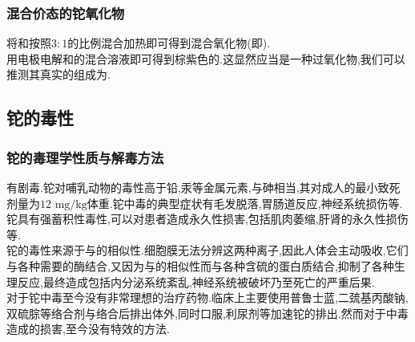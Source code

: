 \documentclass{ctexart}
\begin{document}
\subsubsection{混合价态的铊氧化物}
将和按照$3:1$的比例混合加热即可得到混合氧化物(即).\\
\indent 用电极电解和的混合溶液即可得到棕紫色的.这显然应当是一种过氧化物,我们可以推测其真实的组成为.
\subsection{铊的毒性}
\subsubsection{铊的毒理学性质与解毒方法}
有剧毒.铊对哺乳动物的毒性高于铅,汞等金属元素,与砷相当,其对成人的最小致死剂量为$12\text{ mg/kg}$体重.铊中毒的典型症状有毛发脱落,胃肠道反应,神经系统损伤等.铊具有强蓄积性毒性,可以对患者造成永久性损害,包括肌肉萎缩,肝肾的永久性损伤等.\\
\indent 铊的毒性来源于与的相似性.细胞膜无法分辨这两种离子,因此人体会主动吸收,它们与各种需要的酶结合,又因为与的相似性而与各种含硫的蛋白质结合,抑制了各种生理反应,最终造成包括内分泌系统紊乱,神经系统被破坏乃至死亡的严重后果.\\
\indent 对于铊中毒至今没有非常理想的治疗药物.临床上主要使用普鲁士蓝,二巯基丙酸钠,双硫腙等络合剂与络合后排出体外,同时口服,利尿剂等加速铊的排出.然而对于中毒造成的损害,至今没有特效的方法.
\end{document}
